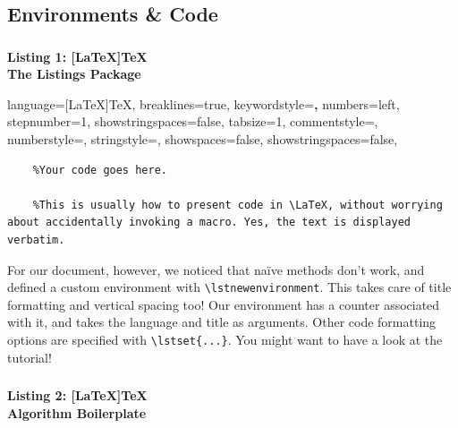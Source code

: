 \documentclass[10pt, Computer Modern]{article}
\theoremstyle{remark}
\begin{document}
	\subsection{Environments \& Code}

	
\subsubsection*{}
	\label{list:1}
	\begin{center}
		\textbf{\large Listing 1: [LaTeX]TeX}
		\\
		\textbf{\small The Listings Package}

	\end{center}


	{
	\lstset
	{
    language=[LaTeX]TeX,
    breaklines=true,
    keywordstyle=\color{blue}\textbf,
    numbers=left,
    stepnumber=1,
    showstringspaces=false,
    tabsize=1,
    commentstyle=\color{DarkGreen},
    numberstyle=\tiny\color{gray},
    stringstyle=\color{Maroon},
    showspaces=false,                
    showstringspaces=false,
	}
	} 
	{
	}
	
	\raggedright
	\begin{case}
	\begin{lstlisting}
	%Your code goes here.

	%This is usually how to present code in \LaTeX, without worrying about accidentally invoking a macro. Yes, the text is displayed verbatim.
	\end{lstlisting}
	\label{trickq}
	\end{case}



	For our document, however, we noticed that na\"ive methods don’t work, and defined a custom environment with \verb!\lstnewenvironment!. This takes care of title formatting and vertical spacing too! Our environment has a counter associated with it, and takes the language and title as arguments. Other code formatting options are specified with \verb!\lstset{...}!. You might want to have a look at the tutorial!


\clearpage
\subsubsection*{}
	\label{list:2}
	\begin{center}
		\textbf{\large Listing 2: [LaTeX]TeX}
		\\
		\normalsize
		\textbf{ Algorithm Boilerplate}

	\end{center}
\end{document}
